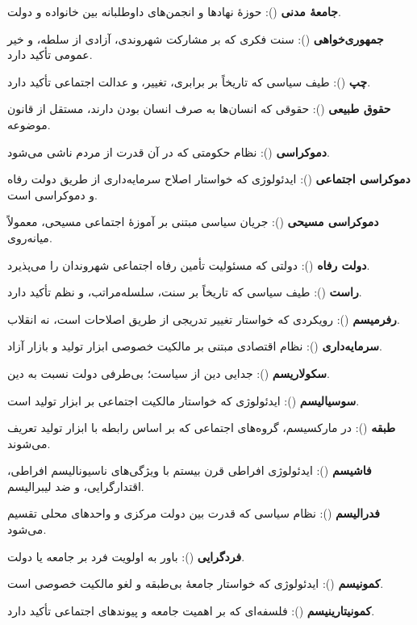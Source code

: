\textbf{جامعهٔ مدنی} (): حوزهٔ نهادها و انجمن‌های داوطلبانه بین خانواده و دولت.

\textbf{جمهوری‌خواهی} (): سنت فکری که بر مشارکت شهروندی، آزادی از سلطه، و خیر عمومی تأکید دارد.

\textbf{چپ} (): طیف سیاسی که تاریخاً بر برابری، تغییر، و عدالت اجتماعی تأکید دارد.

\textbf{حقوق طبیعی} (): حقوقی که انسان‌ها به صرف انسان بودن دارند، مستقل از قانون موضوعه.

\textbf{دموکراسی} (): نظام حکومتی که در آن قدرت از مردم ناشی می‌شود.

\textbf{دموکراسی اجتماعی} (): ایدئولوژی که خواستار اصلاح سرمایه‌داری از طریق دولت رفاه و دموکراسی است.

\textbf{دموکراسی مسیحی} (): جریان سیاسی مبتنی بر آموزهٔ اجتماعی مسیحی، معمولاً میانه‌روی.

\textbf{دولت رفاه} (): دولتی که مسئولیت تأمین رفاه اجتماعی شهروندان را می‌پذیرد.

\textbf{راست} (): طیف سیاسی که تاریخاً بر سنت، سلسله‌مراتب، و نظم تأکید دارد.

\textbf{رفرمیسم} (): رویکردی که خواستار تغییر تدریجی از طریق اصلاحات است، نه انقلاب.

\textbf{سرمایه‌داری} (): نظام اقتصادی مبتنی بر مالکیت خصوصی ابزار تولید و بازار آزاد.

\textbf{سکولاریسم} (): جدایی دین از سیاست؛ بی‌طرفی دولت نسبت به دین.

\textbf{سوسیالیسم} (): ایدئولوژی که خواستار مالکیت اجتماعی بر ابزار تولید است.

\textbf{طبقه} (): در مارکسیسم، گروه‌های اجتماعی که بر اساس رابطه با ابزار تولید تعریف می‌شوند.

\textbf{فاشیسم} (): ایدئولوژی افراطی قرن بیستم با ویژگی‌های ناسیونالیسم افراطی، اقتدارگرایی، و ضد لیبرالیسم.

\textbf{فدرالیسم} (): نظام سیاسی که قدرت بین دولت مرکزی و واحدهای محلی تقسیم می‌شود.

\textbf{فردگرایی} (): باور به اولویت فرد بر جامعه یا دولت.

\textbf{کمونیسم} (): ایدئولوژی که خواستار جامعهٔ بی‌طبقه و لغو مالکیت خصوصی است.

\textbf{کمونیتارینیسم} (): فلسفه‌ای که بر اهمیت جامعه و پیوندهای اجتماعی تأکید دارد.

